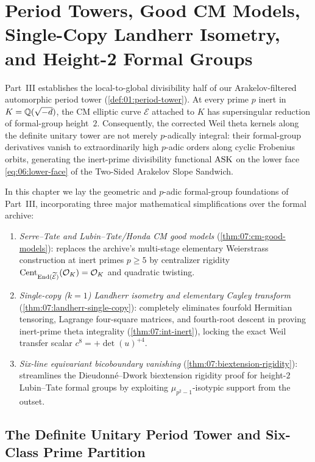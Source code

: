 \chapter{Period Towers, Good CM Models, Single-Copy Landherr Isometry, and Height-2 Formal Groups}
\label{ch:07}

Part~III establishes the local-to-global divisibility half of our Arakelov-filtered automorphic period tower (\cref{def:01:period-tower}). At every prime $p$ inert in $K = \mathbb{Q}(\sqrt{-d})$, the CM elliptic curve $\mathcal{E}$ attached to $K$ has supersingular reduction of formal-group height~$2$. Consequently, the corrected Weil theta kernels along the definite unitary tower are not merely $p$-adically integral: their formal-group derivatives vanish to extraordinarily high $p$-adic orders along cyclic Frobenius orbits, generating the inert-prime divisibility functional $\mathrm{ASK}$ on the lower face \eqref{eq:06:lower-face} of the Two-Sided Arakelov Slope Sandwich.

In this chapter we lay the geometric and $p$-adic formal-group foundations of Part~III, incorporating three major mathematical simplifications over the formal archive:
\begin{enumerate}[label=(\roman*)]
\item \emph{Serre--Tate and Lubin--Tate/Honda CM good models} (\cref{thm:07:cm-good-models}): replaces the archive's multi-stage elementary Weierstrass construction at inert primes $p \ge 5$ by centralizer rigidity $\operatorname{Cent}_{\mathrm{End}(\widetilde{\mathcal{E}})}(\mathcal{O}_K) = \mathcal{O}_K$ and quadratic twisting.
\item \emph{Single-copy ($k = 1$) Landherr isometry and elementary Cayley transform} (\cref{thm:07:landherr-single-copy}): completely eliminates fourfold Hermitian tensoring, Lagrange four-square matrices, and fourth-root descent in proving inert-prime theta integrality (\cref{thm:07:int-inert}), locking the exact Weil transfer scalar $c^8 = +\det(u)^{+4}$.
\item \emph{Six-line equivariant bicoboundary vanishing} (\cref{thm:07:biextension-rigidity}): streamlines the Dieudonn\'e--Dwork biextension rigidity proof for height-$2$ Lubin--Tate formal groups by exploiting $\mu_{p^2-1}$-isotypic support from the outset.
\end{enumerate}

\section{The Definite Unitary Period Tower and Six-Class Prime Partition}
\label{sec:07:tower-data}

